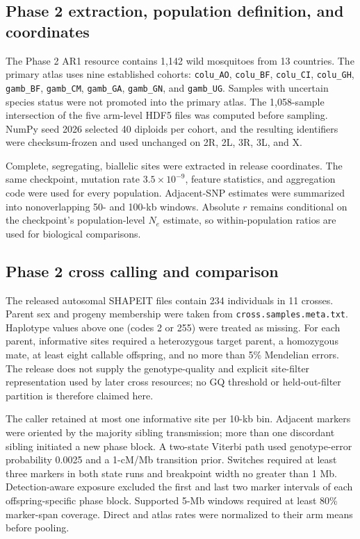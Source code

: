 \subsection*{Phase 2 extraction, population definition, and coordinates}

The Phase 2 AR1 resource contains 1,142 wild mosquitoes from 13 countries. The primary atlas uses nine established cohorts: \texttt{colu\_AO}, \texttt{colu\_BF}, \texttt{colu\_CI}, \texttt{colu\_GH}, \texttt{gamb\_BF}, \texttt{gamb\_CM}, \texttt{gamb\_GA}, \texttt{gamb\_GN}, and \texttt{gamb\_UG}. Samples with uncertain species status were not promoted into the primary atlas. The 1,058-sample intersection of the five arm-level HDF5 files was computed before sampling. NumPy seed 2026 selected 40 diploids per cohort, and the resulting identifiers were checksum-frozen and used unchanged on 2R, 2L, 3R, 3L, and X.

{\small}

Complete, segregating, biallelic sites were extracted in release coordinates. The same checkpoint, mutation rate \(3.5\times10^{-9}\), feature statistics, and aggregation code were used for every population. Adjacent-SNP estimates were summarized into nonoverlapping 50- and 100-kb windows. Absolute \(r\) remains conditional on the checkpoint's population-level \(N_e\) estimate, so within-population ratios are used for biological comparisons.

\subsection*{Phase 2 cross calling and comparison}

The released autosomal SHAPEIT files contain 234 individuals in 11 crosses. Parent sex and progeny membership were taken from \texttt{cross.samples.meta.txt}. Haplotype values above one (codes 2 or 255) were treated as missing. For each parent, informative sites required a heterozygous target parent, a homozygous mate, at least eight callable offspring, and no more than 5\% Mendelian errors. The release does not supply the genotype-quality and explicit site-filter representation used by later cross resources; no GQ threshold or held-out-filter partition is therefore claimed here.

The caller retained at most one informative site per 10-kb bin. Adjacent markers were oriented by the majority sibling transmission; more than one discordant sibling initiated a new phase block. A two-state Viterbi path used genotype-error probability 0.0025 and a 1-cM/Mb transition prior. Switches required at least three markers in both state runs and breakpoint width no greater than 1 Mb. Detection-aware exposure excluded the first and last two marker intervals of each offspring-specific phase block. Supported 5-Mb windows required at least 80\% marker-span coverage. Direct and atlas rates were normalized to their arm means before pooling.

